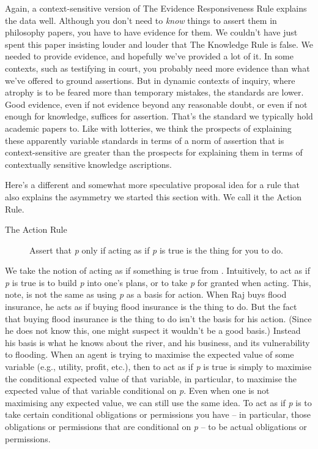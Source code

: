 Again, a context-sensitive version of The Evidence Responsiveness Rule explains the data well. Although you don't need to \textit{know} things to assert them in philosophy papers, you have to have evidence for them. We couldn't have just spent this paper insisting louder and louder that The Knowledge Rule is false. We needed to provide evidence, and hopefully we've provided a lot of it. In some contexts, such as testifying in court, you probably need more evidence than what we've offered to ground assertions. But in dynamic contexts of inquiry, where atrophy is to be feared more than temporary mistakes, the standards are lower. Good evidence, even if not evidence beyond any reasonable doubt, or even if not enough for knowledge, suffices for assertion. That's the standard we typically hold academic papers to. Like with lotteries, we think the prospects of explaining these apparently variable standards in terms of a norm of assertion that is context-sensitive are greater than the prospects for explaining them in terms of contextually sensitive knowledge ascriptions.

Here's a different and somewhat more speculative proposal idea for a rule that also explains the asymmetry we started this section with. We call it the Action Rule.

\begin{description}
\item[The Action Rule] Assert that \textit{p} only if acting as if \textit{p} is true is the thing for you to do.
\end{description}

We take the notion of acting as if something is true from \citet{Stalnaker1973-STAP-5}. Intuitively, to act as if \textit{p} is true is to build \textit{p} into one's plans, or to take \textit{p} for granted when acting. This, note, is not the same as using \textit{p} as a basis for action. When Raj buys flood insurance, he acts as if buying flood insurance is the thing to do. But the fact that buying flood insurance is the thing to do isn't the basis for his action. (Since he does not know this, one might suspect it wouldn't be a good basis.) Instead his basis is what he knows about the river, and his business, and its vulnerability to flooding. When an agent is trying to maximise the expected value of some variable (e.g., utility, profit, etc.), then to act as if \textit{p} is true is simply to maximise the conditional expected value of that variable, in particular, to maximise the expected value of that variable conditional on \textit{p}. Even when one is not maximising any expected value, we can still use the same idea. To act as if \textit{p} is to take certain conditional obligations or permissions you have -- in particular, those obligations or permissions that are conditional on \textit{p} -- to be actual obligations or permissions.

